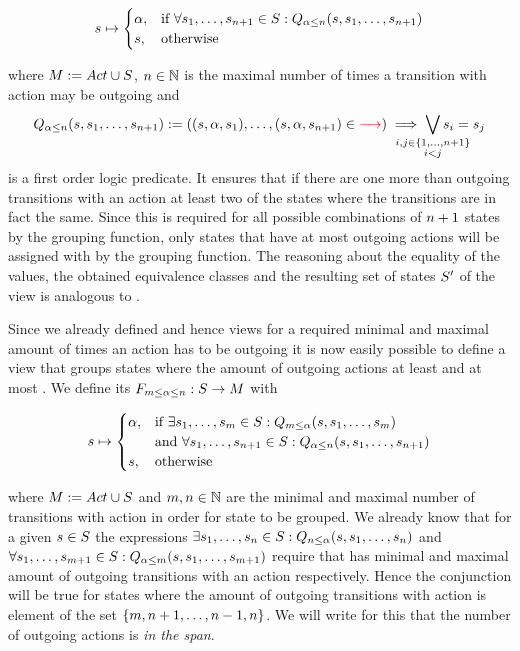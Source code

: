 \documentclass[preview]{standalone}
\begin{document}
\[
\state \mapsto
\begin{cases}
	\action,				& \text{if } \forall \state_1, \dots, \state_{\numoutact+1} \in \states: \predmaxoutact \\
	\state,          	& \text{otherwise}
\end{cases}
\]

where $\imggrp := \setoutact$, $\numoutact \in \natnums$ is the maximal number of times a transition with action \action may be outgoing and 
\[
	\predmaxoutact := ((\state, \action, \state_1), \dots, (\state, \action, \state_{\numoutact+1}) \in \redcomment{\transitionrel}) \implies \bigvee_{\mathclap{\substack{i,j \in \{1,\dots, \numoutact+1\} \\ i < j}}} \state_i = \state_j
\]
is a first order logic predicate. It ensures that if there are one more than \numoutact outgoing transitions with an action \action at least two of the states where the transitions  are in fact the same. Since this is required for all possible combinations of $\numoutact + 1$ states by the grouping function, only states that have at most \numoutact outgoing actions will be assigned with \action by the grouping function. The reasoning about the equality of the \grpfctN values, the obtained equivalence classes and the resulting set of states $\states'$ of the view is analogous to \viewminoutaction.

Since we already defined \grpfctsN and hence views for a required minimal and maximal amount of times an action has to be outgoing it is now easily possible to define a view that groups states where the amount of outgoing actions at least \numoutact and at most \numoutactb. We define its \grpfctN $\gfctspanoutaction : \states \to \arbset$ with

\[
\state \mapsto
\begin{cases}
	\action,				& \text{if } \exists \state_1, \dots, \state_\numoutactb \in \states: \predminoutact[\numoutactb] \\ &\text{and } \forall \state_1, \dots, \state_{\numoutact+1} \in \states: \predmaxoutact \\
	\state,          	& \text{otherwise}
\end{cases}
\]

where $\imggrp := \setoutact$ and $\numoutactb, \numoutact \in \natnums$ are the minimal and maximal number of transitions with action \action in order for state to be grouped.
We already know that for a given $\state \in \states$ the expressions $\exists \state_1, \dots, \state_\numoutact \in \states: \predminoutact$ and $\forall \state_1, \dots, \state_{\numoutactb+1} \in \states: \predmaxoutact[\numoutactb]$ require that \state has minimal and maximal amount of outgoing transitions with an action \action respectively. Hence the conjunction will be true for states where the amount of outgoing transitions with action \action is element of the set $\{\numoutactb, \numoutact+1, \dots, \numoutact-1, \numoutact\}$. We will write for this that the number of outgoing actions is \emph{in the span}.
\end{document}

